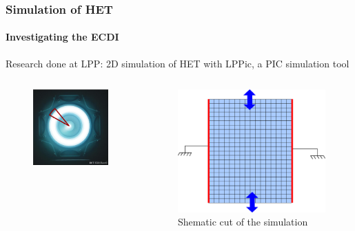 \documentclass[sans, aspectratio=169]{beamer}
\begin{document}
\begin{frame} 
	\frametitle{Simulation of HET} 
	\framesubtitle{ Investigating the ECDI } 
	Research done at LPP: 
	2D simulation of HET with LPPic, a PIC simulation tool
	\begin{columns}

	\begin{column}{0.45\linewidth}
		\begin{figure}[hbtp]
		\centering
		\includegraphics[scale=0.25]{images/Simulationcut.png}
	\end{figure}
	
	\end{column}

	\begin{column}{0.45\linewidth}
		\begin{figure}[hbtp]
		\centering
		\includegraphics[scale=0.5]{images/2D_Rtheta.png}
		\caption{Shematic cut of the simulation}
		\end{figure}
	

\end{column}
\end{columns}
\end{frame}
\end{document}
